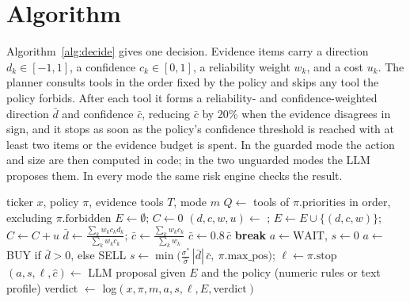 \section{Algorithm}
Algorithm~\ref{alg:decide} gives one decision. Evidence items carry a direction $d_k\in[-1,1]$, a confidence $c_k\in[0,1]$, a reliability weight $w_k$, and a cost $u_k$. The planner consults tools in the order fixed by the policy and skips any tool the policy forbids. After each tool it forms a reliability- and confidence-weighted direction $\bar d$ and confidence $\bar c$, reducing $\bar c$ by 20\% when the evidence disagrees in sign, and it stops as soon as the policy's confidence threshold is reached with at least two items or the evidence budget is spent. In the guarded mode the action and size are then computed in code; in the two unguarded modes the LLM proposes them. In every mode the same risk engine checks the result.

\begin{algorithm}[!htbp]
\caption{Policy-conditioned decision with deterministic audit}
\label{alg:decide}
\begin{algorithmic}[1]
\Require ticker $x$, policy $\pi$, evidence tools $T$, mode $m$
\State $Q \gets$ tools of $\pi.\text{priorities}$ in order, excluding $\pi.\text{forbidden}$
\State $E \gets \emptyset$;\; $C \gets 0$
  \State $(d,c,w,u) \gets$ ;\; $E \gets E \cup \{(d,c,w)\}$;\; $C \gets C + u$
  \State $\bar d \gets \frac{\sum_k w_k c_k d_k}{\sum_k w_k c_k}$;\; $\bar c \gets \frac{\sum_k w_k c_k}{\sum_k w_k}$
   $\bar c \gets 0.8\,\bar c$ \EndIf
   \textbf{break} \EndIf
\EndWhile
{}
   $a \gets \text{WAIT}$, $s \gets 0$
  \Else
    \State $a \gets$ BUY if $\bar d>0$, else SELL
    \State $s \gets \min\!\big(\tfrac{\sigma^\ast}{\hat\sigma}\,|\bar d|\,\bar c,\ \pi.\text{max\_pos}\big)$;\; $\ell \gets \pi.\text{stop}$
  \EndIf
\Else
  \State $(a,s,\ell,\hat c) \gets$ LLM proposal given $E$ and the policy (numeric rules or text profile)
\EndIf
\State verdict $\gets$  
\State \Return log$(x,\pi,m,a,s,\ell,E,\text{verdict})$
\end{algorithmic}
\end{algorithm}

